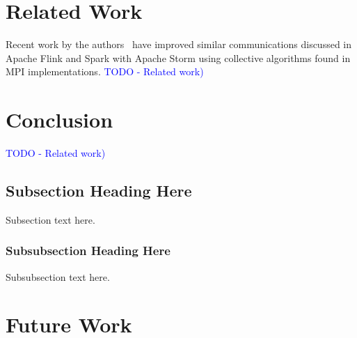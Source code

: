\documentclass[10pt, conference, compsocconf]{IEEEtran}
\begin{document}
\section{Related Work} \label{sec:related}
Recent work by the authors~\cite{kamburugamuve2016towards} have improved similar communications discussed in Apache Flink and Spark with Apache Storm using collective algorithms found in MPI implementations.   
\textcolor{blue}{TODO - Related work)}

\section{Conclusion} \label{sec:conclusion}
\textcolor{blue}{TODO - Related work)}



\subsection{Subsection Heading Here}
Subsection text here.


\subsubsection{Subsubsection Heading Here}
Subsubsection text here.

\section{Future Work}


%
%
\end{document}
